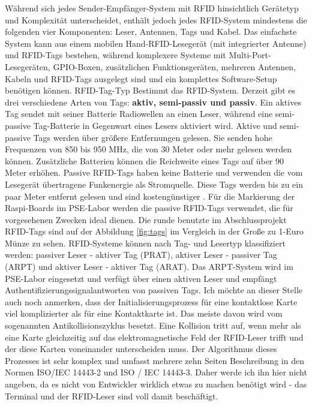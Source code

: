 Während sich jedes Sender-Empfänger-System mit RFID hinsichtlich Gerätetyp und Komplexität unterscheidet, enthält jedoch jedes RFID-System mindestens die folgenden vier Komponenten: Leser, Antennen, Tags und Kabel. Das einfachste System kann aus einem mobilen Hand-RFID-Lesegerät (mit integrierter Antenne) und RFID-Tags bestehen, während komplexere Systeme mit Multi-Port-Lesegeräten, GPIO-Boxen, zusätzlichen Funktionsgeräten, mehreren Antennen, Kabeln und RFID-Tags ausgelegt sind und ein komplettes Software-Setup benötigen können. RFID-Tag-Typ Bestimmt das RFID-System. Derzeit gibt es drei verschiedene Arten von Tags: \textbf{aktiv, semi-passiv und passiv}. Ein aktives Tag sendet mit seiner Batterie Radiowellen an einen Leser, während eine semi-passive Tag-Batterie in Gegenwart eines Lesers aktiviert wird. Aktive und semi-passive Tags werden über größere Entfernungen gelesen. Sie senden hohe Frequenzen von 850 bis 950 MHz, die von 30 Meter oder mehr gelesen werden können. Zusätzliche Batterien können die Reichweite eines Tags auf über 90 Meter erhöhen. Passive RFID-Tags haben keine Batterie und verwenden die vom Lesegerät übertragene Funkenergie als Stromquelle. Diese Tags werden bis zu ein paar Meter entfernt gelesen und sind kostengünstiger \cite{website:13}. Für die Markierung der Raspi-Boards im PSE-Labor werden die passive RFID-Tags verwendet, die für vorgesehenen Zwecken ideal dienen. Die runde benutzte im Abschlussprojekt RFID-Tags sind auf der Abbildung \ref{fig:tags} im Vergleich in der Große zu 1-Euro Münze zu sehen. RFID-Systeme können nach Tag- und Lesertyp klassifiziert werden: passiver Leser - aktiver Tag (PRAT), aktiver Leser - passiver Tag (ARPT) und aktiver Leser - aktiver Tag (ARAT). Das ARPT-System wird im PSE-Labor eingesetzt und verfügt über einen aktiven Leser und empfängt Authentifizierungssignalantworten von passiven Tags. Ich möchte an dieser Stelle auch noch anmerken, dass der Initialisierungsprozess für eine kontaktlose Karte viel komplizierter als für eine Kontaktkarte ist. Das meiste davon wird vom sogenannten Antikollisionszyklus besetzt. Eine Kollision tritt auf, wenn mehr als eine Karte gleichzeitig auf das elektromagnetische Feld der RFID-Leser trifft und der diese Karten voneinander unterscheiden muss. Der Algorithmus dieses Prozesses ist sehr komplex und umfasst mehrere zehn Seiten Beschreibung in den Normen ISO/IEC 14443-2 und ISO / IEC 14443-3. Daher werde ich ihn hier nicht angeben, da es nicht von Entwickler wirklich etwas zu machen benötigt wird - das Terminal und der RFID-Leser sind voll damit beschäftigt.

